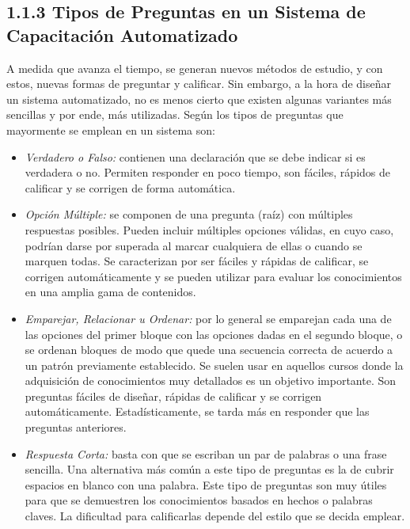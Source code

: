 \documentclass[12pt,a4paper]{report}
\begin{document}
\subsection*{1.1.3 Tipos de Preguntas en un Sistema de Capacitación Automatizado}
A medida que avanza el tiempo, se generan nuevos métodos de estudio, y con estos, nuevas formas de preguntar y calificar. Sin embargo, a la hora de diseñar un sistema automatizado, no es menos cierto que existen algunas variantes más sencillas y por ende, más utilizadas. Según \cite{referencia12} los tipos de preguntas que mayormente se emplean en un sistema son:
\begin{itemize}
\item \textsl{Verdadero o Falso:} contienen una declaración que se debe indicar si es verdadera o no. Permiten responder en poco tiempo, son fáciles, rápidos de calificar y se corrigen de forma automática.
\item \textsl{Opción Múltiple:} se componen de una pregunta (raíz) con
múltiples respuestas posibles. Pueden incluir múltiples opciones válidas, en cuyo caso, podrían darse por superada al marcar cualquiera de ellas o cuando se marquen todas. Se caracterizan por ser fáciles y rápidas de calificar, se
corrigen automáticamente y se pueden utilizar para evaluar los conocimientos en una amplia gama de contenidos.
\item \textsl{Emparejar, Relacionar u Ordenar:} por lo general se emparejan cada una de las opciones del primer bloque con las opciones dadas en el segundo bloque, o se ordenan bloques de modo que quede una secuencia correcta de acuerdo a un patrón previamente establecido. Se suelen usar en aquellos cursos donde la adquisición de conocimientos muy detallados es un objetivo importante. Son preguntas fáciles de diseñar, rápidas de calificar y se corrigen
automáticamente. Estadísticamente, se tarda más en responder que las preguntas anteriores.
\item \textsl{Respuesta Corta:} basta con que se escriban un par de palabras o una frase sencilla. Una alternativa más común a este tipo de preguntas es la de cubrir espacios en blanco con una palabra. Este tipo de preguntas son muy útiles para que se demuestren los conocimientos basados en hechos o palabras claves. La dificultad para calificarlas depende del estilo que se decida emplear.
\end{itemize}

\nocite{*}


\end{document}
